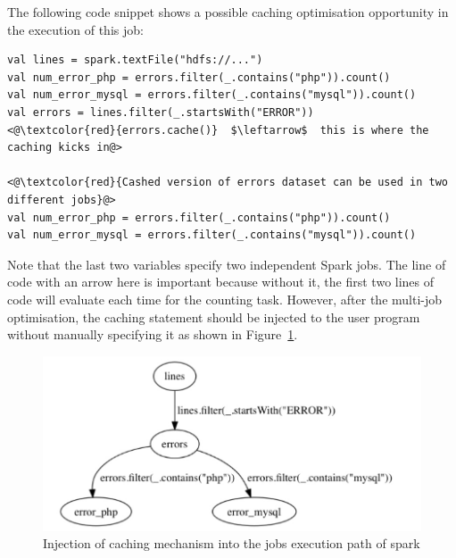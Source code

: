 \documentclass[conference]{sig-alternate-05-2015}
\begin{document}
The following code snippet shows a possible caching optimisation opportunity in the execution of this job:

\begin{lstlisting}[frame=single, caption=Possible Caching Example, label=code:example, breaklines=true]
val lines = spark.textFile("hdfs://...")
val num_error_php = errors.filter(_.contains("php")).count()
val num_error_mysql = errors.filter(_.contains("mysql")).count()
val errors = lines.filter(_.startsWith("ERROR"))
<@\textcolor{red}{errors.cache()}  $\leftarrow$  this is where the caching kicks in@>

<@\textcolor{red}{Cashed version of errors dataset can be used in two different jobs}@>
val num_error_php = errors.filter(_.contains("php")).count()
val num_error_mysql = errors.filter(_.contains("mysql")).count()
\end{lstlisting} 

Note that the last two variables specify two independent Spark jobs. The line of code with an arrow here is important because without it, the first two lines of code will evaluate each time for the counting task. However, after the multi-job optimisation, the caching statement should be injected to the user program without manually specifying it as shown in Figure~\ref{fig:example}. 

\begin{figure}[htbp]
	\centering	 
		\includegraphics[width=0.95\columnwidth]{images/1.JPEG}
	\caption{Injection of caching mechanism into the jobs execution path of spark}
	\label{fig:example}
\end{figure}
\end{document}
